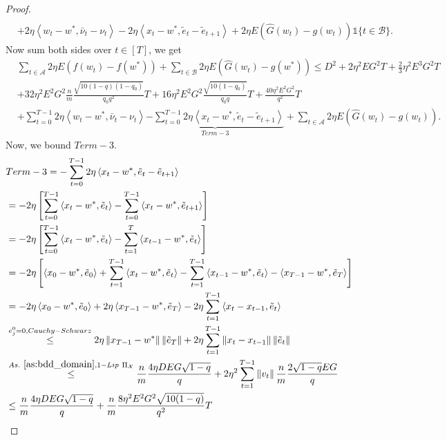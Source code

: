\documentclass{article} %
\newcommand\norm[1]{\left\lVert#1\right\rVert}
\def\A{{\mathcal A}}
\def\B{{\mathcal B}}
\newcommand{\inner}[2]{\left\langle #1, #2 \right\rangle}
\begin{document}
\begin{proof}
\begin{align*}
        \\
        & + 2\eta \inner{w_t - w^*}{\bar{\nu}_t - \nu_t} - 2\eta \inner{x_t - w^*}{\tilde{e}_t - \tilde{e}_{t+1}} + 2\eta E(\hat{G}(w_t) - g(w_t))\mathds{1}\{t \in \B\}.
    \end{align*}
    Now sum both sides over $t \in [T]$, we get
    \begin{align*}
        &\sum_{t \in \A}2\eta E(f(w_t) - f(w^*) ) + \sum_{t \in \B}2\eta E(\hat{G}(w_t) - g(w^*)) \leq D^2+ 2\eta^2EG^2T + \frac{2}{3}\eta^2E^3G^2T 
        \\
        &+ 32\eta^2 E^2G^2\frac{n}{m}\frac{\sqrt{10(1-q) (1-q_0)}}{q_0q^2}T + 16\eta^2 E^2G^2\frac{\sqrt{10(1-q_0)}}{q_0q}T + \frac{40 \eta^2 E^2G^2}{ q^2}T
        \\
        & + \sum_{t=0}^{T-1}2\eta \inner{w_t - w^*}{\bar{\nu}_t - \nu_t} \underbrace{-\sum_{t=0}^{T-1} 2\eta \inner{x_t - w^*}{\tilde{e}_t - \tilde{e}_{t+1}}}_{Term-3}+ \sum_{t \in \A} 2\eta E(\hat{G}(w_t) - g(w_t)).
    \end{align*}
    Now, we bound $Term-3$.
    \begin{align*}
        &Term-3 = -\sum_{t=0}^{T-1} 2\eta \inner{x_t - w^*}{\tilde{e}_t - \tilde{e}_{t+1}}
        \\
        & = - 2\eta \left[\sum_{t=0}^{T-1}\inner{x_t - w^*}{\tilde{e}_t} - \sum_{t=0}^{T-1}\inner{x_t - w^*}{\tilde{e}_{t+1}}\right]
        \\
        & = - 2\eta \left[\sum_{t=0}^{T-1}\inner{x_t - w^*}{\tilde{e}_t} - \sum_{t=1}^{T}\inner{x_{t-1} - w^*}{\tilde{e}_{t}}\right]
        \\
        & = - 2\eta \left[\inner{x_0 - w^*}{\tilde{e}_0} + \sum_{t=1}^{T-1}\inner{x_t - w^*}{\tilde{e}_t} - \sum_{t=1}^{T-1}\inner{x_{t-1} - w^*}{\tilde{e}_{t}} - \inner{x_{T-1} - w^*}{\tilde{e}_{T}}\right]
        \\
        & = - 2\eta \inner{x_0 - w^*}{\tilde{e}_0} + 2\eta\inner{x_{T-1} - w^*}{\tilde{e}_{T}} - 2\eta\sum_{t=1}^{T-1}\inner{x_t - x_{t-1}}{\tilde{e}_t}
        \\
        &\overset{e_j^0=0, Cauchy-Schwarz}{\leq} 2\eta \norm{x_{T-1} - w^*}\norm{\tilde{e}_{T}} + 2\eta\sum_{t=1}^{T-1}\norm{x_t - x_{t-1}}\norm{\tilde{e}_t}
        \\
        &\overset{As.~\ref{as:bdd_domain}, 1-Lip\ \Pi_\mathcal{X}}{\leq}  \frac{n}{m}\frac{4\eta DEG\sqrt{1-q}}{q} + 2\eta^2 \sum_{t=1}^{T-1}\norm{v_t}\frac{n}{m}\frac{2\sqrt{1-q}EG}{q}
        \\
        &\leq \frac{n}{m}\frac{4\eta DEG\sqrt{1-q}}{q} +  \frac{n}{m}\frac{8\eta^2 E^2G^2\sqrt{10(1-q)}}{ q^2}T

\end{align*}
\end{proof}
\end{document}
